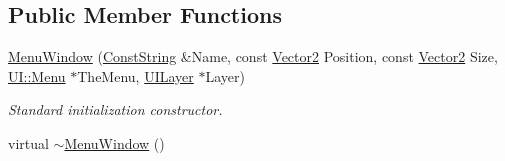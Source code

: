 \subsection*{Public Member Functions}
\begin{DoxyCompactItemize}
\item 
\hyperlink{classphys_1_1UI_1_1MenuWindow_a8d62e0cdbb3e8073c62b67c3e0b4dfda}{MenuWindow} (\hyperlink{namespacephys_a5ce5049f8b4bf88d6413c47b504ebb31}{ConstString} \&Name, const \hyperlink{classphys_1_1Vector2}{Vector2} Position, const \hyperlink{classphys_1_1Vector2}{Vector2} Size, \hyperlink{classphys_1_1UI_1_1Menu}{UI::Menu} $\ast$TheMenu, \hyperlink{classphys_1_1UILayer}{UILayer} $\ast$Layer)
\begin{DoxyCompactList}\small\item\em Standard initialization constructor. \item\end{DoxyCompactList}\item 
\hypertarget{classphys_1_1UI_1_1MenuWindow_a8de1eab7a7897e24dfb722cce7d903eb}{
virtual \hyperlink{classphys_1_1UI_1_1MenuWindow_a8de1eab7a7897e24dfb722cce7d903eb}{$\sim$MenuWindow} ()}
\label{d4/d07/classphys_1_1UI_1_1MenuWindow_a8de1eab7a7897e24dfb722cce7d903eb}


\end{DoxyCompactItemize}
